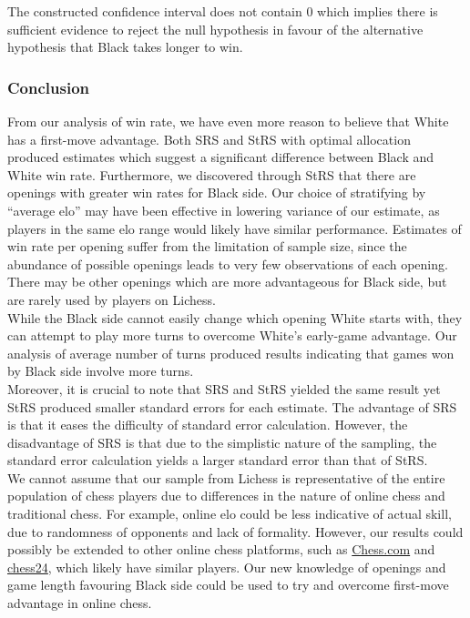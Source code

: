 \documentclass[11pt,]{article}
\begin{document}
The constructed confidence interval does not contain 0 which implies
there is sufficient evidence to reject the null hypothesis in favour of
the alternative hypothesis that Black takes longer to win.\\
\newline

\hypertarget{conclusion}{%
\subsubsection{\texorpdfstring{\textbf{Conclusion}}{Conclusion}}\label{conclusion}}

From our analysis of win rate, we have even more reason to believe that
White has a first-move advantage. Both SRS and StRS with optimal
allocation produced estimates which suggest a significant difference
between Black and White win rate. \newline Furthermore, we discovered
through StRS that there are openings with greater win rates for Black
side. Our choice of stratifying by ``average elo'' may have been
effective in lowering variance of our estimate, as players in the same
elo range would likely have similar performance. Estimates of win rate
per opening suffer from the limitation of sample size, since the
abundance of possible openings leads to very few observations of each
opening. There may be other openings which are more advantageous for
Black side, but are rarely used by players on Lichess.\\
\newline While the Black side cannot easily change which opening White
starts with, they can attempt to play more turns to overcome White's
early-game advantage. Our analysis of average number of turns produced
results indicating that games won by Black side involve more turns.\\
\newline Moreover, it is crucial to note that SRS and StRS yielded the
same result yet StRS produced smaller standard errors for each estimate.
The advantage of SRS is that it eases the difficulty of standard error
calculation. However, the disadvantage of SRS is that due to the
simplistic nature of the sampling, the standard error calculation yields
a larger standard error than that of StRS.\\
\newline We cannot assume that our sample from Lichess is representative
of the entire population of chess players due to differences in the
nature of online chess and traditional chess. For example, online elo
could be less indicative of actual skill, due to randomness of opponents
and lack of formality. However, our results could possibly be extended
to other online chess platforms, such as
\href{https://www.chess.com/}{Chess.com} and
\href{https://chess24.com/en}{chess24}, which likely have similar
players. Our new knowledge of openings and game length favouring Black
side could be used to try and overcome first-move advantage in online
chess. \newpage
\end{document}
